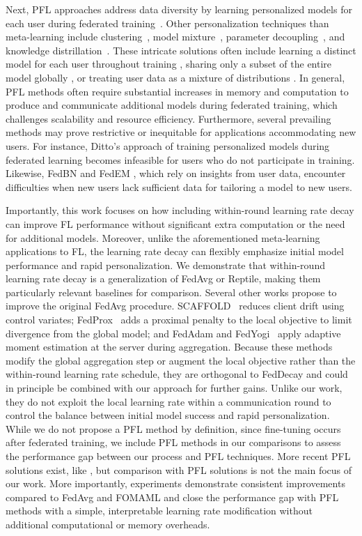 Next, PFL approaches address data diversity by learning personalized models for each user during federated training~\citep{toward-pfl, pfl}.
Other personalization techniques than meta-learning include clustering~\citep{cluster-plus, cluster-sattler, cluster-briggs}, model mixture~\citep{ditto, cluster-plus, fedem, pfl-fo}, parameter decoupling~\citep{fedbn, pfl-layers, shared-pfl, think-locally}, and knowledge distrillation~\citep{ensemble-distil, fedme, dfml, mutual-fl}.
These intricate solutions often include learning a distinct model for each user throughout training \citep{ditto}, sharing only a subset of the entire model globally \citep{fedbn}, or treating user data as a mixture of distributions \citep{fedem}.
In general, PFL methods often require substantial increases in memory and computation to produce and communicate additional models during federated training, which challenges scalability and resource efficiency.
Furthermore, several prevailing methods may prove restrictive or inequitable for applications accommodating new users.
For instance, Ditto's approach \citep{ditto} of training personalized models during federated learning becomes infeasible for users who do not participate in training.
Likewise, FedBN \citep{fedbn} and FedEM \citep{fedem}, which rely on insights from user data, encounter difficulties when new users lack sufficient data for tailoring a model to new users.

Importantly, this work focuses on how including within-round learning rate decay can improve FL performance without significant extra computation or the need for additional models.
Moreover, unlike the aforementioned meta-learning applications to FL, the learning rate decay can flexibly emphasize initial model performance and rapid personalization.
We demonstrate that within-round learning rate decay is a generalization of FedAvg or Reptile, making them particularly relevant baselines for comparison.
Several other works propose to improve the original FedAvg procedure.
SCAFFOLD~\citep{scaffold} reduces client drift using control variates; FedProx~\citep{fedprox} adds a proximal penalty to the local objective to limit divergence from the global model; and FedAdam and FedYogi~\citep{fed-opt} apply adaptive moment estimation at the server during aggregation.
Because these methods modify the global aggregation step or augment the local objective rather than the within-round learning rate schedule, they are orthogonal to FedDecay and could in principle be combined with our approach for further gains.
Unlike our work, they do not exploit the local learning rate within a communication round to control the balance between initial model success and rapid personalization.
While we do not propose a PFL method by definition, since fine-tuning occurs after federated training, we include PFL methods in our comparisons to assess the performance gap between our process and PFL techniques.
More recent PFL solutions exist, like \citet{knn-per}, but comparison with PFL solutions is not the main focus of our work.
More importantly, experiments demonstrate consistent improvements compared to FedAvg and FOMAML and close the performance gap with PFL methods with a simple, interpretable learning rate modification without additional computational or memory overheads.
